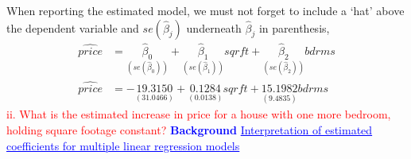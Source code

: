 \documentclass[12pt]{report}
\newenvironment{blueframed}[1][blue]
{\def\FrameCommand{\fboxsep=\FrameSep\fcolorbox{#1}{white}}%
\MakeFramed {\advance\hsize-\width \FrameRestore}}
{\endMakeFramed}
\begin{document}
\vspace{-\baselineskip}
\noindent When reporting the estimated model, we must not forget to include a `hat' above the dependent variable and $se(\hat{\beta}_j)$ underneath $\hat{\beta}_j$ in parenthesis,
\begin{align*}
\widehat{price} &= \underset{(se(\hat{\beta}_0))}{\hat{\beta}_0} + \underset{(se(\hat{\beta}_1))}{\hat{\beta}_1}sqrft + \underset{(se(\hat{\beta}_2))}{\hat{\beta}_2}bdrms \\
\widehat{price} &= -\underset{(31.0466)}{19.3150} + \underset{(0.0138)}{0.1284}sqrft + \underset{(9.4835)}{15.1982}bdrms
\end{align*}
\noindent \textcolor{red}
{
	ii. What is the estimated increase in price for a house with one more bedroom, holding square footage constant?
}
\newpage
\justify
\begin{blueframed}
	\textcolor{blue}{\textbf{Background}}
	\vspace{-\baselineskip}
	\justify
	\textcolor{blue}{\underline{Interpretation of estimated coefficients for multiple linear regression models}}
	

\end{blueframed}
\end{document}
